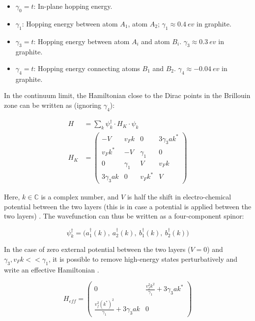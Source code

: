 \documentclass[]{article}
\begin{document}
\begin{itemize}
	\item $\gamma_0 = t$: In-plane hopping energy.
	\item $\gamma_1$: Hopping energy between atom $A_1$, atom $A_2$; $\gamma_1 \approx 0.4  \ ev$ in graphite.
	\item $\gamma_3 = t$: Hopping energy between atom $A_i$ and atom $B_i$. $\gamma_3 \approx 0.3  \ ev$ in graphite.
	\item $\gamma_4 = t$: Hopping energy connecting atoms $B_1$ and $B_2$. $\gamma_4 \approx -0.04  \ ev$ in graphite.
\end{itemize}

In the continuum limit, the Hamiltonian close to the Dirac points in the Brillouin zone can be written as (ignoring $\gamma_4$):

\begin{align}
	H &= \sum_k \psi_k^{\dagger} \cdot H_K \cdot \psi_k\\
	H_K &= \begin{pmatrix}
			-V &  v_F k & 0 & 3\gamma_3 ak^{*}\\
			v_F k^{*} & -V & \gamma_1 & 0\\
			0 & \gamma_1 & V & v_F k\\
			3\gamma_3 ak & 0 & v_Fk^{*} & V
			\end{pmatrix}
\end{align}

Here, $k \in \mathbb{C}$ is a complex number, and $V$ is half the shift in electro-chemical potential between the two layers (this is in case a potential is applied between the two layers) \cite{The_Electronic_Properties_of_Graphene}. The wavefunction can thus be written as a four-component spinor:

\begin{equation}
	\psi_k^{\dagger} = \bigg ( a_1^{\dagger}(k), \ a_2^{\dagger}(k), \ b_1^{\dagger}(k), \ b_2^{\dagger}(k) \bigg )
\end{equation}

In the case of zero external potential between the two layers ($V=0$) and $\gamma_3, v_F k << \gamma_1$, it is possible to remove high-energy states perturbatively and write an effective Hamiltonian \cite{The_Electronic_Properties_of_Graphene}.

\begin{equation}
	H_{eff} = 
	\begin{pmatrix}
	0 & \frac{v_f^2 k^2}{\gamma_1} + 3\gamma_3ak^{*}\\
	\frac{v_f^2 (k^{*})^2}{\gamma_1} + 3\gamma_3ak & 0	
	\end{pmatrix}
\end{equation}
\end{document}
